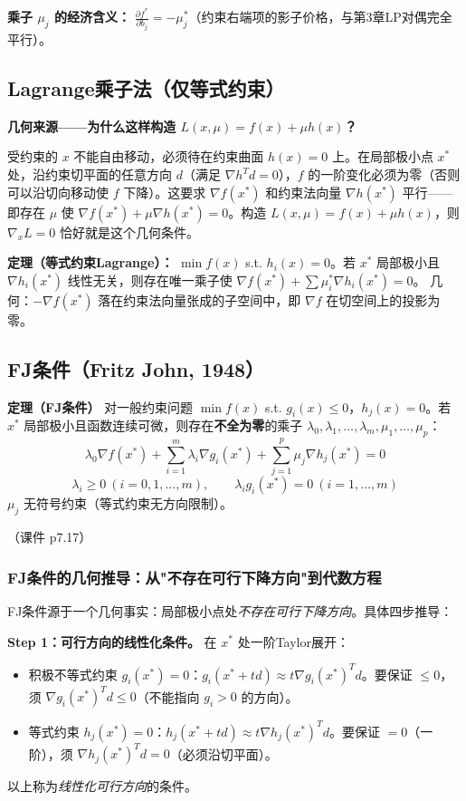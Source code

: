 \textbf{乘子 $\mu_j$ 的经济含义：} $\frac{\partial f^*}{\partial b_j} = -\mu_j^*$（约束右端项的影子价格，与第3章LP对偶完全平行）。

\subsection{Lagrange乘子法（仅等式约束）}

\textbf{几何来源——为什么这样构造 $L(x,\mu)=f(x)+\mu h(x)$？}

受约束的 $x$ 不能自由移动，必须待在约束曲面 $h(x)=0$ 上。在局部极小点 $x^*$ 处，沿约束切平面的任意方向 $d$（满足 $\nabla h^T d=0$），$f$ 的一阶变化必须为零（否则可以沿切向移动使 $f$ 下降）。这要求 $\nabla f(x^*)$ 和约束法向量 $\nabla h(x^*)$ 平行——即存在 $\mu$ 使 $\nabla f(x^*)+\mu\nabla h(x^*)=0$。构造 $L(x,\mu)=f(x)+\mu h(x)$，则 $\nabla_x L=0$ 恰好就是这个几何条件。

\textbf{定理（等式约束Lagrange）：}
$\min f(x)$ s.t. $h_i(x)=0$。若 $x^*$ 局部极小且 $\nabla h_i(x^*)$ 线性无关，则存在唯一乘子使
$\nabla f(x^*) + \sum\mu_i^*\nabla h_i(x^*)=0$。
几何：$-\nabla f(x^*)$ 落在约束法向量张成的子空间中，即 $\nabla f$ 在切空间上的投影为零。

\subsection{FJ条件（Fritz John, 1948）}

\textbf{定理（FJ条件）}
对一般约束问题 $\min f(x)$ s.t. $g_i(x)\le 0$，$h_j(x)=0$。若 $x^*$ 局部极小且函数连续可微，则存在\textbf{不全为零}的乘子 $\lambda_0,\lambda_1,\dots,\lambda_m,\mu_1,\dots,\mu_p$：
\[
\boxed{\lambda_0 \nabla f(x^*) + \sum_{i=1}^m \lambda_i \nabla g_i(x^*) + \sum_{j=1}^p \mu_j \nabla h_j(x^*) = 0}
\]
\[
\lambda_i \ge 0\ (i=0,1,\dots,m),\qquad \lambda_i g_i(x^*) = 0\ (i=1,\dots,m)
\]
$\mu_j$ 无符号约束（等式约束无方向限制）。

（课件 p7.17）

\subsubsection{FJ条件的几何推导：从"不存在可行下降方向"到代数方程}

FJ条件源于一个几何事实：局部极小点处\emph{不存在可行下降方向}。具体四步推导：

\textbf{Step 1：可行方向的线性化条件。} 在 $x^*$ 处一阶Taylor展开：
\begin{itemize}
  \item 积极不等式约束 $g_i(x^*)=0$：$g_i(x^*+td)\approx t\nabla g_i(x^*)^T d$。要保证 $\le 0$，须 $\nabla g_i(x^*)^T d \le 0$（不能指向 $g_i>0$ 的方向）。
  \item 等式约束 $h_j(x^*)=0$：$h_j(x^*+td)\approx t\nabla h_j(x^*)^T d$。要保证 $=0$（一阶），须 $\nabla h_j(x^*)^T d = 0$（必须沿切平面）。
\end{itemize}
以上称为\emph{线性化可行方向}的条件。

